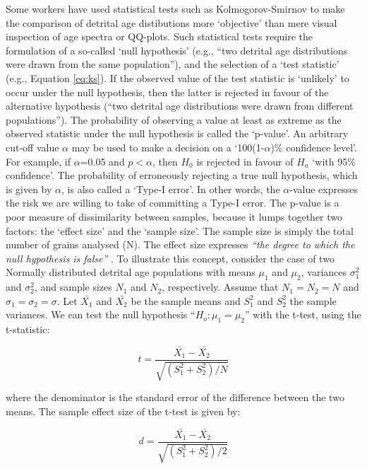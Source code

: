 \documentclass[authoryear,preprint,review,12pt]{elsarticle}
\begin{document}
Some workers have used statistical tests such as Kolmogorov-Smirnov to
make the comparison of detrital age distibutions more `objective' than
mere visual inspection of age spectra or QQ-plots.  Such statistical
tests require the formulation of a so-called `null hypothesis' (e.g.,
``two detrital age distributions were drawn from the same
population''), and the selection of a `test statistic' (e.g., Equation
\ref{eq:ks}).  If the observed value of the test statistic is
`unlikely' to occur under the null hypothesis, then the latter is
rejected in favour of the alternative hypothesis (``two detrital age
distributions were drawn from different populations'').  The
probability of observing a value at least as extreme as the observed
statistic under the null hypothesis is called the `p-value'.  An
arbitrary cut-off value $\alpha$ may be used to make a decision on a
`100(1-$\alpha$)\% confidence level'. For example, if $\alpha$=0.05
and $p<\alpha$, then $H_0$ is rejected in favour of $H_a$ `with 95\%
confidence'.  The probability of erroneously rejecting a true null
hypothesis, which is given by $\alpha$, is also called a `Type-I
error'. In other words, the $\alpha$-value expresses the risk we are
willing to take of committing a Type-I error.  The p-value is a poor
measure of dissimilarity between samples, because it lumps together
two factors: the `effect size' and the `sample size'.  The sample size
is simply the total number of grains analysed (N).  The effect size
expresses {\it``the degree to which the null hypothesis is false''}
\citep{cohen1977}. To illustrate this concept, consider the case of
two Normally distributed detrital age populations with means $\mu_1$
and $\mu_2$, variances $\sigma_1^2$ and $\sigma_2^2$, and sample sizes
$N_1$ and $N_2$, respectively.  Assume that $N_1 = N_2 = N$ and
$\sigma_1 = \sigma_2 = \sigma$.  Let $\bar{X_1}$ and $\bar{X_2}$ be
the sample means and $S_1^2$ and $S_2^2$ the sample variances. We can
test the null hypothesis ``$H_o: \mu_1 = \mu_2$'' with the t-test,
using the t-statistic:

\begin{equation}
t = \frac{\bar{X_1}-\bar{X_2}}{\sqrt{(S_1^2+S_2^2)/N}}
\label{eq:t-stat1}
\end{equation}

where the denominator is the standard error of the difference between
the two means. The sample effect size of the t-test is given by:

\begin{equation}
d = \frac{\bar{X_1}-\bar{X_2}}{\sqrt{(S_1^2+S_2^2)/2}}
\label{eq:t-stat2}
\end{equation}
\end{document}
